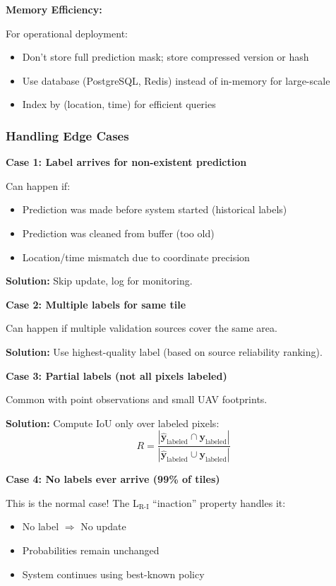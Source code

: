 \documentclass[11pt]{article}
\begin{document}
\textbf{Memory Efficiency:}

For operational deployment:
\begin{itemize}
    \item Don't store full prediction mask; store compressed version or hash
    \item Use database (PostgreSQL, Redis) instead of in-memory for large-scale
    \item Index by (location, time) for efficient queries
\end{itemize}

\subsubsection{Handling Edge Cases}

\textbf{Case 1: Label arrives for non-existent prediction}

Can happen if:
\begin{itemize}
    \item Prediction was made before system started (historical labels)
    \item Prediction was cleaned from buffer (too old)
    \item Location/time mismatch due to coordinate precision
\end{itemize}

\textbf{Solution:} Skip update, log for monitoring.

\textbf{Case 2: Multiple labels for same tile}

Can happen if multiple validation sources cover the same area.

\textbf{Solution:} Use highest-quality label (based on source reliability ranking).

\textbf{Case 3: Partial labels (not all pixels labeled)}

Common with point observations and small UAV footprints.

\textbf{Solution:} Compute IoU only over labeled pixels:
\[
R = \frac{|\hat{\mathbf{y}}_{\text{labeled}} \cap \mathbf{y}_{\text{labeled}}|}{|\hat{\mathbf{y}}_{\text{labeled}} \cup \mathbf{y}_{\text{labeled}}|}
\]

\textbf{Case 4: No labels ever arrive (99\% of tiles)}

This is the normal case! The L$_{\text{R-I}}$ ``inaction'' property handles it:
\begin{itemize}
    \item No label $\Rightarrow$ No update
    \item Probabilities remain unchanged
    \item System continues using best-known policy
\end{itemize}
\end{document}
